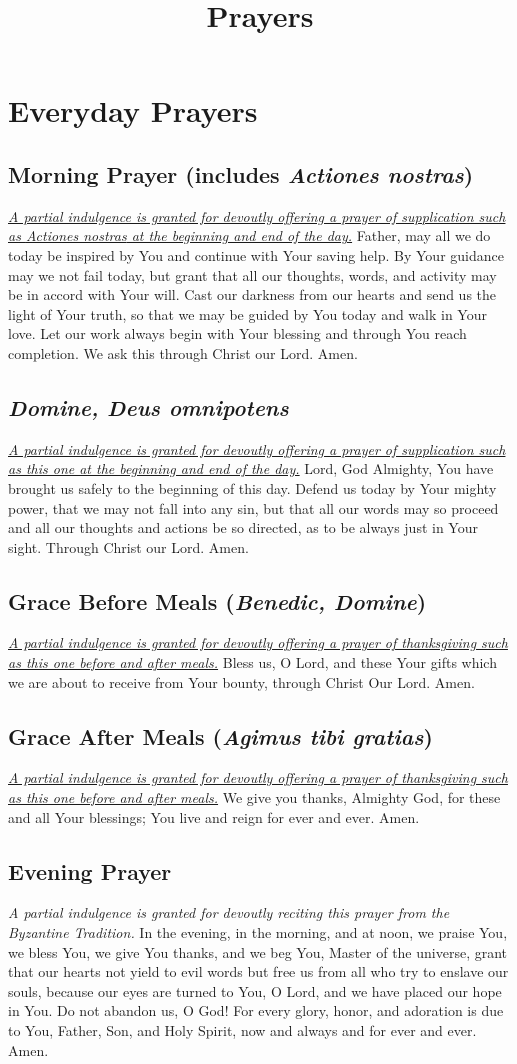 \documentclass[12pt]{article}
\newcommand{\prayersection}[1]{\section{#1}}
\newcommand{\prayertitle}[1]{\subsection{#1}}
\newcommand{\indulgencedprayertitle}[1]{\prayertitle{#1 \protect\kreuz}}
\newcommand{\foreign}[1]{\textsl{#1}}
\newcommand{\note}[1]{{\small{\textsl{#1}}}\newline}
\newcommand{\linkednote}[2]{\hyperlink{#1}{\note{#2}}}
\begin{document}
\title{\textbf{Prayers}\date{\vspace{-10ex}}}\maketitle
\tableofcontents\newpage

\prayersection{Everyday Prayers}
\indulgencedprayertitle{Morning Prayer (includes \foreign{Actiones nostras})}
\linkednote{grant26}{A partial indulgence is granted for devoutly offering a prayer of supplication such as \foreign{Actiones nostras} at the beginning and end of the day.}
Father, may all we do today be inspired by You and continue with Your saving help.
By Your guidance may we not fail today, but grant that all our thoughts, words, and activity may be in accord with Your will.
Cast our darkness from our hearts and send us the light of Your truth, so that we may be guided by You today and walk in Your love.
Let our work always begin with Your blessing and through You reach completion.
We ask this through Christ our Lord.
Amen.

\indulgencedprayertitle{\foreign{Domine, Deus omnipotens}}
\linkednote{grant26}{A partial indulgence is granted for devoutly offering a prayer of supplication such as this one at the beginning and end of the day.}
Lord, God Almighty, You have brought us safely to the beginning of this day.
Defend us today by Your mighty power, that we may not fall into any sin, but that all our words may so proceed and all our thoughts and actions be so directed, as to be always just in Your sight.
Through Christ our Lord.
Amen.

\indulgencedprayertitle{Grace Before Meals (\foreign{Benedic, Domine})}
\linkednote{grant26}{A partial indulgence is granted for devoutly offering a prayer of thanksgiving such as this one before and after meals.}
Bless us, O Lord, and these Your gifts which we are about to receive from Your bounty, through Christ Our Lord.
Amen.

\indulgencedprayertitle{Grace After Meals (\foreign{Agimus tibi gratias})}
\linkednote{grant26}{A partial indulgence is granted for devoutly offering a prayer of thanksgiving such as this one before and after meals.}
We give you thanks, Almighty God, for these and all Your blessings;
You live and reign for ever and ever.
Amen.
\newpage
\indulgencedprayertitle{Evening Prayer}
\note{A partial indulgence is granted for devoutly reciting this prayer from the Byzantine Tradition.}
In the evening, in the morning, and at noon, we praise You, we bless You,
we give You thanks, and we beg You, Master of the universe, grant that our hearts not yield to evil words but free us from all who try to enslave our souls, because our eyes are turned to You, O Lord, and we have placed our hope in You.
Do not abandon us, O God!
For every glory, honor, and adoration is due to You, Father, Son, and Holy Spirit, now and always and for ever and ever.
Amen.
\end{document}
